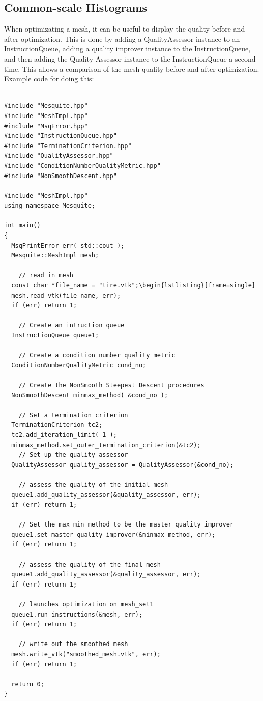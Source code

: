 \subsection{Common-scale Histograms}

When optimizating a mesh, it can be useful to display the quality before and after optimization.  This is done by adding a QualityAssessor instance to an InstructionQueue, adding a quality improver instance to the InstructionQueue, and then adding the Quality Assessor instance to the InstructionQueue a second time.  This allows a comparison of the mesh quality before and after optimization.  Example code for doing this:

\begin{lstlisting}[frame=single]

#include "Mesquite.hpp"
#include "MeshImpl.hpp"
#include "MsqError.hpp"
#include "InstructionQueue.hpp"
#include "TerminationCriterion.hpp"
#include "QualityAssessor.hpp"
#include "ConditionNumberQualityMetric.hpp"
#include "NonSmoothDescent.hpp"

#include "MeshImpl.hpp"
using namespace Mesquite;

int main()
{
  MsqPrintError err( std::cout );
  Mesquite::MeshImpl mesh;

    // read in mesh
  const char *file_name = "tire.vtk";\begin{lstlisting}[frame=single]
  mesh.read_vtk(file_name, err);
  if (err) return 1;

    // Create an intruction queue
  InstructionQueue queue1;

    // Create a condition number quality metric
  ConditionNumberQualityMetric cond_no;

    // Create the NonSmooth Steepest Descent procedures
  NonSmoothDescent minmax_method( &cond_no );

    // Set a termination criterion
  TerminationCriterion tc2;
  tc2.add_iteration_limit( 1 );
  minmax_method.set_outer_termination_criterion(&tc2);
    // Set up the quality assessor
  QualityAssessor quality_assessor = QualityAssessor(&cond_no);

    // assess the quality of the initial mesh
  queue1.add_quality_assessor(&quality_assessor, err);
  if (err) return 1;

    // Set the max min method to be the master quality improver
  queue1.set_master_quality_improver(&minmax_method, err);
  if (err) return 1;

    // assess the quality of the final mesh
  queue1.add_quality_assessor(&quality_assessor, err);
  if (err) return 1;

    // launches optimization on mesh_set1
  queue1.run_instructions(&mesh, err);
  if (err) return 1;

    // write out the smoothed mesh
  mesh.write_vtk("smoothed_mesh.vtk", err);
  if (err) return 1;

  return 0;
}

\end{lstlisting}


